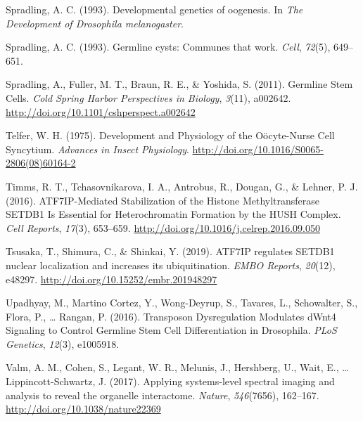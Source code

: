 \documentclass[12pt,oneside]{reedthesis}
\begin{document}
\leavevmode\hypertarget{ref-spradlingDevelopmentalGeneticsOogenesis1993}{}%
Spradling, A. C. (1993). Developmental genetics of oogenesis. In \emph{The Development of Drosophila melanogaster}.

\leavevmode\hypertarget{ref-spradlingGermlineCystsCommunes1993}{}%
Spradling, A. C. (1993). Germline cysts: Communes that work. \emph{Cell}, \emph{72}(5), 649--651.

\leavevmode\hypertarget{ref-spradlingGermlineStemCells2011a}{}%
Spradling, A., Fuller, M. T., Braun, R. E., \& Yoshida, S. (2011). Germline Stem Cells. \emph{Cold Spring Harbor Perspectives in Biology}, \emph{3}(11), a002642. \url{http://doi.org/10.1101/cshperspect.a002642}

\leavevmode\hypertarget{ref-telferDevelopmentPhysiologyOocyteNurse1975}{}%
Telfer, W. H. (1975). Development and Physiology of the Oöcyte-Nurse Cell Syncytium. \emph{Advances in Insect Physiology}. \url{http://doi.org/10.1016/S0065-2806(08)60164-2}

\leavevmode\hypertarget{ref-timmsATF7IPMediatedStabilizationHistone2016}{}%
Timms, R. T., Tchasovnikarova, I. A., Antrobus, R., Dougan, G., \& Lehner, P. J. (2016). ATF7IP-Mediated Stabilization of the Histone Methyltransferase SETDB1 Is Essential for Heterochromatin Formation by the HUSH Complex. \emph{Cell Reports}, \emph{17}(3), 653--659. \url{http://doi.org/10.1016/j.celrep.2016.09.050}

\leavevmode\hypertarget{ref-tsusakaATF7IPRegulatesSETDB12019}{}%
Tsusaka, T., Shimura, C., \& Shinkai, Y. (2019). ATF7IP regulates SETDB1 nuclear localization and increases its ubiquitination. \emph{EMBO Reports}, \emph{20}(12), e48297. \url{http://doi.org/10.15252/embr.201948297}

\leavevmode\hypertarget{ref-upadhyayTransposonDysregulationModulates2016}{}%
Upadhyay, M., Martino Cortez, Y., Wong-Deyrup, S., Tavares, L., Schowalter, S., Flora, P., \ldots{} Rangan, P. (2016). Transposon Dysregulation Modulates dWnt4 Signaling to Control Germline Stem Cell Differentiation in Drosophila. \emph{PLoS Genetics}, \emph{12}(3), e1005918.

\leavevmode\hypertarget{ref-valmApplyingSystemslevelSpectral2017}{}%
Valm, A. M., Cohen, S., Legant, W. R., Melunis, J., Hershberg, U., Wait, E., \ldots{} Lippincott-Schwartz, J. (2017). Applying systems-level spectral imaging and analysis to reveal the organelle interactome. \emph{Nature}, \emph{546}(7656), 162--167. \url{http://doi.org/10.1038/nature22369}
\end{document}
